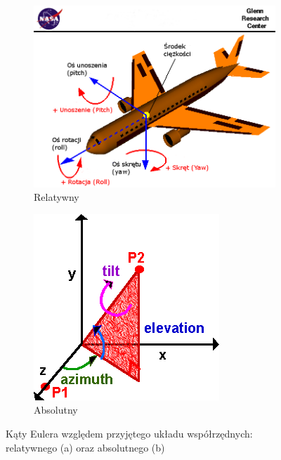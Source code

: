 \begin{savenotes}
	\begin{figure}[!htb]
		\captionsetup{singlelinecheck=off}
		\centering
		\begin{subfigure}[b]{0.63\textwidth}
			\centering
			\includegraphics[width=\textwidth]{images/nasaAircraft.png}	
			\caption[Kąty Eulera w relatywnym układzie współrzędnych]{Relatywny}
			\label{fig:appx:rot:eulerRel}
		\end{subfigure}
		\hfill																																						
		\begin{subfigure}[b]{0.35\textwidth}
			\centering
			\includegraphics[width=\textwidth]{images/eulerAbsolute.png}		
			\caption[Kąty Eulera w absolutnym układzie współrzędnych]{Absolutny}
			\label{fig:appx:rot:eulerAbs}
		\end{subfigure}																																			
		\caption{Kąty Eulera względem przyjętego układu współrzędnych: relatywnego (a) oraz absolutnego (b)}
		\label{fig:appx:rot:euler}
	\end{figure}
\end{savenotes}
